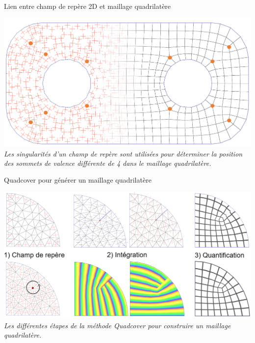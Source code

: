 \begin{frame}{Lien entre champ de repère 2D et maillage quadrilatère}
    \begin{center}
        \includegraphics[width=\linewidth]{img/quadsimu/singus.PNG}
        \small{
            \textit{Les singularités d'un champ de repère sont utilisées pour déterminer la position des sommets de valence différente de 4 dans le maillage quadrilatère.}
        }
    \end{center}
\end{frame}
\begin{frame}{Quadcover pour générer un maillage quadrilatère}
    \begin{center}
        \includegraphics[width=\linewidth]{img/cubecover/pipeline.PNG}
        \small{
            \textit{Les différentes étapes de la méthode Quadcover pour construire un maillage quadrilatère.}
        }
    \end{center}
\end{frame}

